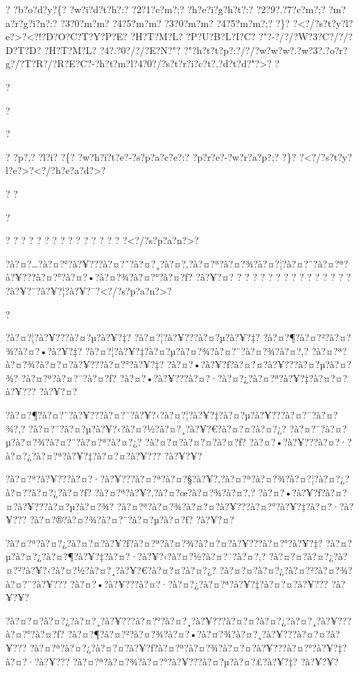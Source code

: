 \documentclass[11pt, openany]{book}
\begin{document}
{{{{{{{{{{{? ?b?o?d?y?\{? ?w?i?d?t?h?:? ?2?1?c?m?;? ?h?e?i?g?h?t?:? ?2?9?.?7?c?m?;?
?m?a?r?g?i?n?:? ?3?0?m?m? ?4?5?m?m? ?3?0?m?m? ?4?5?m?m?;? ?\}?
?\textless{}?/?s?t?y?l?e?\textgreater{}?\textless{}?!?D?O?C?T?Y?P?E?
?H?T?M?L? ?P?U?B?L?I?C? ?"?-?/?/?W?3?C?/?/?D?T?D? ?H?T?M?L?
?4?.?0?/?/?E?N?"?
?"?h?t?t?p?:?/?/?w?w?w?.?w?3?.?o?r?g?/?T?R?/?R?E?C?-?h?t?m?l?4?0?/?s?t?r?i?c?t?.?d?t?d?"?\textgreater{}?
?

?

?

?

? ?p?,? ?l?i? ?\{? ?w?h?i?t?e?-?s?p?a?c?e?:? ?p?r?e?-?w?r?a?p?;? ?\}?
?\textless{}?/?s?t?y?l?e?\textgreater{}?\textless{}?/?h?e?a?d?\textgreater{}?

? ?

?

? ? ? ? ? ? ? ? ? ? ? ? ? ? ? ?\textless{}?/?s?p?a?n?\textgreater{}?

?à?¤?\ldots{}?à?¤?°?à?¥???à?¤?˜?à?¤?¸?à?¤?‚?à?¤?ª?à?¤?¾?à?¤?¦?à?¤?¨?à?¤?ª?à?¥???à?¤?°?à?¤?•?à?¤?¾?à?¤?°?à?¤?ƒ?
?à?¥?¤? ? ? ? ? ? ? ? ? ? ? ? ? ? ? ?
?à?¥?¨?à?¥?¦?à?¥?¯?\textless{}?/?s?p?a?n?\textgreater{}?

?

?à?¤?¦?à?¥???à?¤?µ?à?¥?‡? ?à?¤?¦?à?¥???à?¤?µ?à?¥?‡?
?à?¤?¶?à?¤?²?à?¤?¾?à?¤?•?à?¥?‡?
?à?¤?¦?à?¥?‡?à?¤?µ?à?¤?¾?à?¤?¨?à?¤?¾?à?¤?‚?
?à?¤?ª?à?¤?¾?à?¤?¤?à?¥???à?¤?°?à?¥?‡?
?à?¤?•?à?¥?ƒ?à?¤?¤?à?¥???à?¤?µ?à?¤?¾? ?à?¤?ª?à?¤?¯?à?¤?ƒ?
?à?¤?•?à?¥???à?¤?·?à?¤?¿?à?¤?ª?à?¥?‡?à?¤?¤?à?¥??? ?à?¥?¤?

?à?¤?¶?à?¤?¨?à?¥???à?¤?¨?à?¥?‹?à?¤?¦?à?¥?‡?à?¤?µ?à?¥???à?¤?¯?à?¤?¾?,?
?à?¤?¯?à?¤?µ?à?¥?‹?à?¤?½?à?¤?¸?à?¥?€?à?¤?¤?à?¤?¿?
?à?¤?¯?à?¤?µ?à?¤?¾?à?¤?¨?à?¤?ª?à?¤?¿? ?à?¤?¤?à?¤?¤?à?¤?ƒ?
?à?¤?•?à?¥???à?¤?·?à?¤?¿?à?¤?ª?à?¥?‡?à?¤?¤?à?¥??? ?à?¥?¥?

?à?¤?ª?à?¥???à?¤?·?à?¥???à?¤?ª?à?¤?§?à?¥?‚?à?¤?ª?à?¤?¾?à?¤?¦?à?¤?¿?à?¤?­?à?¤?¿?à?¤?ƒ?
?à?¤?ª?à?¥?‚?à?¤?œ?à?¤?¾?à?¤?‚? ?à?¤?•?à?¥?ƒ?à?¤?¤?à?¥???à?¤?µ?à?¤?¾?
?à?¤?ª?à?¤?¾?à?¤?¤?à?¥???à?¤?°?à?¥?‡?à?¤?·?à?¥???
?à?¤?®?à?¤?¾?à?¤?¨?à?¤?µ?à?¤?ƒ? ?à?¥?¤?

?à?¤?ª?à?¤?¿?à?¤?¤?à?¥?ƒ?à?¤?ª?à?¤?¾?à?¤?¤?à?¥???à?¤?°?à?¥?‡?
?à?¤?µ?à?¤?¿?à?¤?¶?à?¥?‡?à?¤?·?à?¥?‹?à?¤?½?à?¤?¯?à?¤?‚?
?à?¤?¤?à?¤?¿?à?¤?²?à?¥?‹?à?¤?½?à?¤?¸?à?¥?€?à?¤?¤?à?¤?¿?
?à?¤?¤?à?¤?¿?à?¤?²?à?¤?¾?à?¤?¨?à?¥???
?à?¤?•?à?¥???à?¤?·?à?¤?¿?à?¤?ª?à?¥?‡?à?¤?¤?à?¥??? ?à?¥?¥?

?à?¤?¤?à?¤?¿?à?¤?¸?à?¥???à?¤?°?à?¤?¸?à?¥???à?¤?¤?à?¤?¿?à?¤?¸?à?¥???à?¤?°?à?¤?ƒ?
?à?¤?¶?à?¤?²?à?¤?¾?à?¤?•?à?¤?¾?à?¤?¸?à?¥???à?¤?¤?à?¥???
?à?¤?ª?à?¤?¿?à?¤?¤?à?¥?ƒ?à?¤?ª?à?¤?¾?à?¤?¤?à?¥???à?¤?°?à?¥?‡?à?¤?·?à?¥???
?à?¤?ª?à?¤?¾?à?¤?°?à?¥???à?¤?µ?à?¤?£?à?¥?‡? ?à?¥?¥?

}}}}}}}}}}}
\end{document}
